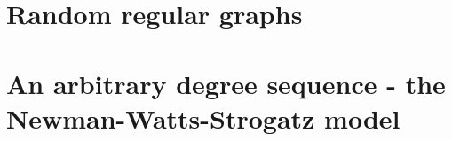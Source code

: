 \section{Random regular graphs}
\section{An arbitrary degree sequence - the Newman-Watts-Strogatz model}